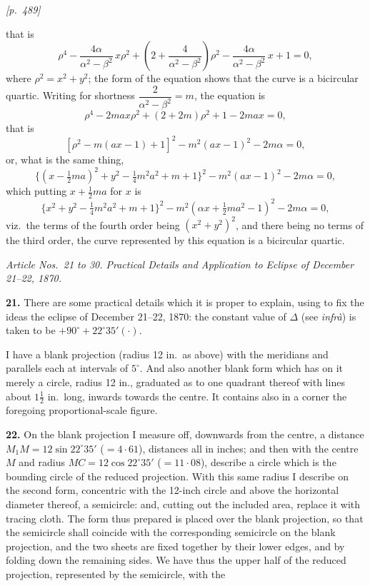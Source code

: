 \documentclass[11pt]{article}
\begin{document}
\medskip

\noindent\textit{[p.~489]}

\medskip

that is
\[
\rho^{4} - \frac{4\alpha}{\alpha^{2}-\beta^{2}}\,x\rho^{2} + \left(2 + \frac{4}{\alpha^{2}-\beta^{2}}\right)\rho^{2} - \frac{4\alpha}{\alpha^{2}-\beta^{2}}\,x + 1 = 0,
\]
where $\rho^{2} = x^{2}+y^{2}$; the form of the equation shows that the
curve is a bicircular quartic. Writing for shortness
$\dfrac{2}{\alpha^{2}-\beta^{2}} = m$, the equation is
\[
\rho^{4} - 2max\rho^{2} + (2 + 2m)\rho^{2} + 1 - 2max = 0,
\]
that is
\[
[\rho^{2} - m(ax-1) + 1]^{2} - m^{2}(ax-1)^{2} - 2m\alpha = 0,
\]
or, what is the same thing,
\[
\{(x - \tfrac{1}{2}ma)^{2} + y^{2} - \tfrac{1}{4}m^{2}a^{2} + m + 1\}^{2} - m^{2}(ax-1)^{2} - 2m\alpha = 0,
\]
which putting $x + \tfrac{1}{2}ma$ for $x$ is
\[
\{x^{2}+y^{2} - \tfrac{1}{4}m^{2}a^{2} + m + 1\}^{2} - m^{2}(\alpha x + \tfrac{1}{2}m a^{2} - 1)^{2} - 2m\alpha = 0,
\]
viz.\ the terms of the fourth order being $(x^{2}+y^{2})^{2}$, and there
being no terms of the third order, the curve represented by this equation
is a bicircular quartic.

\medskip

\begin{center}
\textit{Article Nos.\ 21 to 30. Practical Details and Application to
Eclipse of December 21--22, 1870.}
\end{center}

\medskip

\textbf{21.} There are some practical details which it is proper to
explain, using to fix the ideas the eclipse of December 21--22, 1870: the
constant value of $\Delta$ (see \textit{infr\`a}) is taken to be
$+90^{\circ} + 22^{\circ}35'(\cdot)$.

I have a blank projection (radius 12 in.\ as above) with the meridians
and parallels each at intervals of $5^{\circ}$. And also another blank
form which has on it merely a circle, radius 12 in., graduated as to one
quadrant thereof with lines about $1\tfrac{1}{2}$ in.\ long, inwards
towards the centre. It contains also in a corner the foregoing
proportional-scale figure.

\medskip

\textbf{22.} On the blank projection I measure off, downwards from the
centre, a distance $M_{1}M = 12\sin 22^{\circ}35'$ ($= 4{\cdot}61$),
distances all in inches; and then with the centre $M$ and radius
$MC = 12\cos 22^{\circ}35'$ ($= 11{\cdot}08$), describe a circle which is
the bounding circle of the reduced projection. With this same radius I
describe on the second form, concentric with the 12-inch circle and above
the horizontal diameter thereof, a semicircle: and, cutting out the
included area, replace it with tracing cloth. The form thus prepared is
placed over the blank projection, so that the semicircle shall coincide
with the corresponding semicircle on the blank projection, and the two
sheets are fixed together by their lower edges, and by folding down the
remaining sides. We have thus the upper half of the reduced projection,
represented by the semicircle, with the
\end{document}
